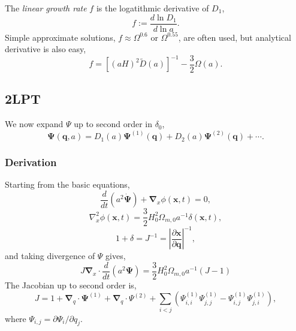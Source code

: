 \documentclass[a4paper]{article}
\begin{document}
%
The \textit{linear growth rate} $f$ is the logatithmic derivative of $D_1$,
\begin{equation}
  f := \frac{d\ln D_1}{d\ln a}.
\end{equation}
Simple approximate solutions, $f \approx \Omega^{0.6}$ or
$\Omega^{0.55}$, are often used, but analytical derivative is also easy,
\begin{equation}
  f = \left[ (aH)^2 \tilde{D}(a) \right]^{-1} - \frac{3}{2} \Omega(a).
\end{equation}

\subsection{2LPT}
We now expand $\Psi$ up to second order in $\delta_0$,
\begin{equation}
  \bm{\Psi}(\bm{q}, a) =
    D_1(a) \bm{\Psi}^{(1)}(\bm{q}) + D_2(a) \bm{\Psi}^{(2)}(\bm{q}) + \cdots.
\end{equation}

\subsubsection{Derivation}
Starting from the basic equations,
\begin{equation}
  \frac{d}{dt} (a^2 \dot{\bm{\Psi}}) + \bm{\nabla}_x \phi(\bm{x}, t) = 0,
\end{equation}
\begin{equation}
  \nabla^2_x \phi(\bm{x}, t) =
    \frac{3}{2}H_0^2 \Omega_{m,0} a^{-1} \delta(\bm{x}, t),
\end{equation}
\begin{equation}
  1 + \delta = J^{-1} =
    \left|\frac{\partial \bm{x}}{\partial \bm{q}} \right|^{-1},
\end{equation}
and taking divergence of $\Psi$ gives,
\begin{equation}
  J \bm{\nabla}_x\cdot \frac{d}{dt}\left(a^2 \bm{\Psi} \right) =
  \frac{3}{2}H_0^2 \Omega_{m,0} a^{-1} (J - 1)
\end{equation}
The Jacobian up to second order is,
\begin{equation}
  J = 1 + \bm{\nabla}_q \cdot \bm{\Psi}^{(1)} + \bm{\nabla}_q \cdot{\Psi}^{(2)}
    + \sum_{i<j} \left( \Psi_{i,i}^{(1)} \Psi_{j,j}^{(1)} - \Psi_{i,j}^{(1)} \Psi_{j,i}^{(1)}\right),
\end{equation}
where $\Psi_{i,j} = \partial \Psi_i / \partial q_j$.
\end{document}
